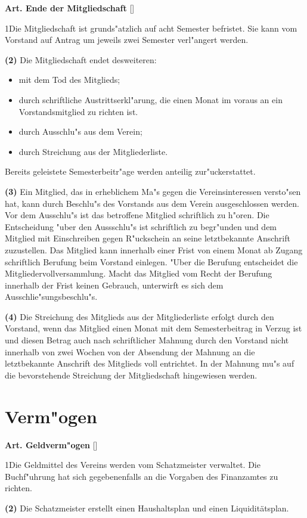 \documentclass[12pt]{article}
\newcommand{\Abschnitt}[1]{\section{#1}}
\newcommand{\Satz}[2]{

\begin{samepage}
{\bf (#1)} #2
\end{samepage}
}
\newenvironment{Artikel}[2]{
\bigskip \centerline{{\bf Art. #1} [#2]}
\nopagebreak
}{
}
\begin{document}
\begin{Artikel}{10}{Ende der Mitgliedschaft}

\Satz{1}{Die Mitgliedschaft ist grunds"atzlich auf acht Semester befristet.
Sie kann vom Vorstand auf Antrag um jeweils zwei Semester verl"angert werden.}

\Satz{2}{Die Mitgliedschaft endet desweiteren:
\begin{itemize}
\item mit dem Tod des Mitglieds;
\item durch schriftliche Austrittserkl"arung, die einen Monat im voraus an
ein Vorstandsmitglied zu richten ist. 
\item durch Ausschlu"s aus dem Verein;
\item durch Streichung aus der Mitgliederliste.
\end{itemize}
Bereits geleistete Semesterbeitr"age werden anteilig zur"uckerstattet.}

\Satz{3}{Ein Mitglied, das in erheblichem Ma"s gegen die Vereinsinteressen
versto"sen hat, kann durch Beschlu"s des Vorstands aus dem Verein 
ausgeschlossen werden. Vor dem Ausschlu"s ist das betroffene Mitglied 
schriftlich zu h"oren. Die Entscheidung "uber den Aussschlu"s ist schriftlich 
zu begr"unden und dem Mitglied mit Einschreiben 
gegen R"uckschein an seine letztbekannte Anschrift zuzustellen. Das Mitglied
kann innerhalb einer Frist von einem Monat ab Zugang schriftlich Berufung beim 
Vorstand einlegen. "Uber die Berufung entscheidet die 
Mitgliedervollversammlung. Macht das Mitglied vom Recht der Berufung 
innerhalb der Frist keinen Gebrauch, unterwirft es sich dem 
Ausschlie"sungsbeschlu"s.}

\Satz{4}{Die Streichung des Mitglieds aus der Mitgliederliste erfolgt durch
den Vorstand, wenn das Mitglied einen Monat mit dem Semesterbeitrag in Verzug 
ist und diesen Betrag auch nach schriftlicher Mahnung durch den Vorstand nicht
innerhalb von zwei Wochen von der Absendung der Mahnung an die letztbekannte 
Anschrift des Mitglieds voll entrichtet. In der Mahnung mu"s auf die 
bevorstehende Streichung der Mitgliedschaft hingewiesen werden.}

\end{Artikel}

\Abschnitt{Verm"ogen}

\begin{Artikel}{11}{Geldverm"ogen}

\Satz{1}{Die Geldmittel des Vereins werden vom Schatzmeister verwaltet. 
Die Buch\-f"uhrung hat sich gegebenenfalls an die Vorgaben des Finanzamtes zu 
richten.}

\Satz{2}{Die Schatzmeister erstellt einen Haushaltsplan und einen
Liquiditätsplan.}

\end{Artikel}
\end{document}
